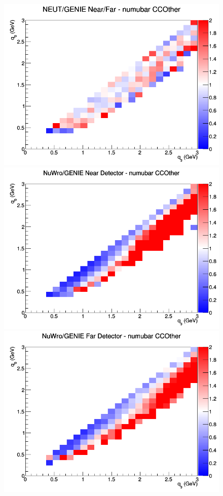\documentclass[12pt]{article}
\begin{document}
\begin{figure}[h]
\endminipage
{}
\includegraphics[width=\linewidth]{q0_q3/nominal/ratios/CCOther_NEUT_GENIE_numubar_NF_q3_q0.png}
\endminipage
\newline
{}
\includegraphics[width=\linewidth]{q0_q3/nominal/ratios/CCOther_NuWro_GENIE_numubar_near_q3_q0.png}
\endminipage
{}
\includegraphics[width=\linewidth]{q0_q3/nominal/ratios/CCOther_NuWro_GENIE_numubar_far_q3_q0.png}

\end{figure}
\end{document}
